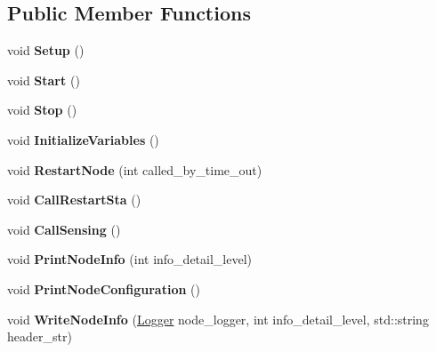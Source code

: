 \subsection*{Public Member Functions}
\begin{DoxyCompactItemize}
\item 
\mbox{\label{classcompcxx__Node__23_aa39779f39e893c00757ffdef42078693}} 
void {\bfseries Setup} ()
\item 
\mbox{\label{classcompcxx__Node__23_ad14267bb799b7b4b2a107f5627ffb434}} 
void {\bfseries Start} ()
\item 
\mbox{\label{classcompcxx__Node__23_a930a5e759b3e75800755fea2ab79bcc5}} 
void {\bfseries Stop} ()
\item 
\mbox{\label{classcompcxx__Node__23_a787413f836a704ca5fc4af8544ecf8bb}} 
void {\bfseries Initialize\+Variables} ()
\item 
\mbox{\label{classcompcxx__Node__23_aa1ce61c7c2df3faf489ad7d0ff91d3c4}} 
void {\bfseries Restart\+Node} (int called\+\_\+by\+\_\+time\+\_\+out)
\item 
\mbox{\label{classcompcxx__Node__23_ad17648e23643eb4ee70a9875abb9eebd}} 
void {\bfseries Call\+Restart\+Sta} ()
\item 
\mbox{\label{classcompcxx__Node__23_a8a93628af7ac0059d7769dcbea892021}} 
void {\bfseries Call\+Sensing} ()
\item 
\mbox{\label{classcompcxx__Node__23_a7989ab0105396bdc356e44ab8ed5b170}} 
void {\bfseries Print\+Node\+Info} (int info\+\_\+detail\+\_\+level)
\item 
\mbox{\label{classcompcxx__Node__23_a1fb31d9f2ed4055a4068580af2287b44}} 
void {\bfseries Print\+Node\+Configuration} ()
\item 
\mbox{\label{classcompcxx__Node__23_af73dc83c66e53a1a4e73ed31a5568807}} 
void {\bfseries Write\+Node\+Info} (\hyperlink{structLogger}{Logger} node\+\_\+logger, int info\+\_\+detail\+\_\+level, std\+::string header\+\_\+str)

\end{DoxyCompactItemize}
